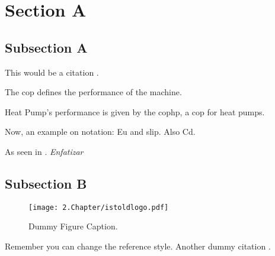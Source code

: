 \section{Section A}
\label{sec:sectiona}

\subsection{Subsection A}
\label{subsec:subasectionA}

This would be a citation \cite{dummy}.

The \gls{cop} defines the performance of the machine.

Heat Pump's performance is given by the \gls{cophp}, a \gls{cop} for heat pumps.

Now, an example on notation: \gls{Eu} and \gls{slip}.
Also \gls{Cd}.

As seen in \cite{wiki}. \emph{Enfatizar}

\subsection{Subsection B}
\label{subsec:subbsectiona}

\begin{figure}[H]
	\centering
		\texttt{[image: 2.Chapter/istoldlogo.pdf]}
	\caption[Dummy Figure Caption for List of Figures.]{Dummy Figure Caption.}
	\label{fig:dummyfigure1}
\end{figure}

Remember you can change the reference style. Another dummy citation \cite{site}.